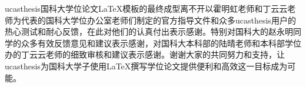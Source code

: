 ucasthesis国科大学位论文\LaTeX{}模板的最终成型离不开以霍明虹老师和丁云云老师为代表的国科大学位办公室老师们制定的官方指导文件和众多ucasthesis用户的热心测试和耐心反馈，在此对他们的认真付出表示感谢。特别对国科大的赵永明同学的众多有效反馈意见和建议表示感谢，对国科大本科部的陆晴老师和本科部学位办的丁云云老师的细致审核和建议表示感谢。谢谢大家的共同努力和支持，让ucasthesis为国科大学子使用\LaTeX{}撰写学位论文提供便利和高效这一目标成为可能。

\cleardoublepage[plain]%

